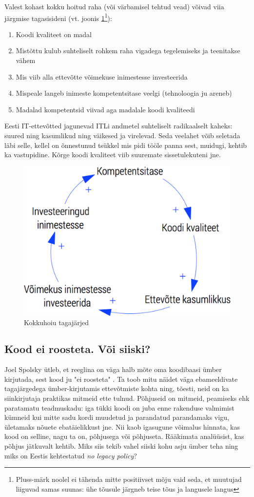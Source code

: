 \documentclass{article}
\begin{document}
Valest kohast kokku hoitud raha (või värbamisel tehtud vead) võivad viia järgmise tagasisideni (vt. joonis \ref{fig:kokkuhoid}\footnote{Pluss-märk noolel ei tähenda mitte positiivset mõju vaid seda, et muutujad liiguvad samas suunas: ühe tõusule järgneb teise tõus ja langusele langus}):
\begin{enumerate}
	\item Koodi kvaliteet on madal
	\item Mistõttu kulub suhteliselt rohkem raha vigadega tegelemiseks ja teenitakse vähem
	\item Mis viib alla ettevõtte võimekuse inimestesse investeerida
	\item Mispeale langeb inimeste kompetentsitase veelgi (tehnoloogia ju areneb)
	\item Madalad kompetentsid viivad aga madalale koodi kvaliteedi
\end{enumerate}

Eesti IT-ettevõtted jagunevad ITLi andmetel suhteliselt radikaalselt kaheks: suured ning kasumlikud ning väikesed ja virelevad. Seda veelahet võib seletada läbi selle, kellel on õnnestunud tsükkel mis pidi tööle panna sest, muidugi, kehtib ka vastupidine. Kõrge koodi kvaliteet viib suuremate sissetulekuteni jne.

\begin{figure}[htp]
	\begin{center}
		\includegraphics[width=.6\textwidth]{kvaliteet.png}
		\caption{Kokkuhoiu tagajärjed}
		\label{fig:kokkuhoid}
	\end{center}
\end{figure}

\subsection{Kood ei roosteta. Või siiski?}
\label{sec:rooste}
Joel Spolsky ütleb, et reeglina on väga halb mõte oma koodibaasi ümber kirjutada, sest kood ju "ei roosteta" \citep{joelrust}. Ta toob mitu näidet väga ebameeldivate tagajärgedega ümber-kirjutamis ettevõtmiste kohta ning, tõesti, neid on ka siinkirjutaja praktikas mitmeid ette tulnud. Põhjuseid on mitmeid, peamiseks ehk paratamatu teadmuskadu: iga tükki koodi on juba enne rakenduse valmimist kümneid kui mitte sadu kordi muudetud ja parandatud parandamaks vigu, ületamaks nõuete ebatäielikkust jne. Nii kaob igasugune võimalus hinnata, kas kood on selline, nagu ta on, põhjusega või põhjuseta. Rääkimata analüüsist, kas põhjus jätkuvalt kehtib. Miks siis tekib vahel siiski kohu asju ümber teha ning miks on Eestis kehtestatud \emph{no legacy policy}?
\end{document}
